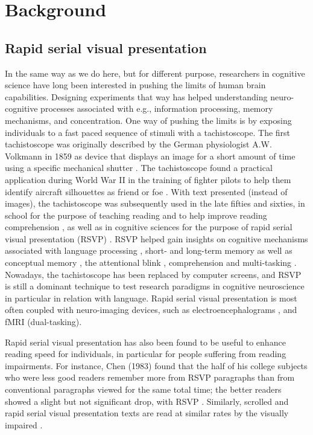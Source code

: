 \section{Background}
\label{background}

\subsection{Rapid serial visual presentation}
In the same way as we do here, but for different purpose, researchers in cognitive science have long been interested in pushing the limits of human brain capabilities. Designing experiments that way has helped understanding neuro-cognitive processes associated with e.g., information processing, memory mechanisms, and concentration. One way of pushing the limits is by exposing individuals to a fast paced sequence of stimuli with a tachistoscope. The first tachistoscope was originally described by the German physiologist A.W. Volkmann in 1859 as device that displays an image for a short amount of time using a specific mechanical shutter \cite{benschop1998tachistoscope}. The tachistoscope found a practical application  during World War II in the training of fighter pilots to help them identify aircraft silhouettes as friend or foe \cite{godnig2003tachistoscope}. With text presented (instead of images), the tachistoscope was subsequently used in the late fifties and sixties, in school for the purpose of teaching reading and to help improve reading comprehension \cite{brown1958teaching}, as well as in cognitive sciences for the purpose of rapid serial visual presentation (RSVP) \cite{potter1984rapid,potter1975time}. RSVP helped gain insights on cognitive mechanisms associated with language processing \cite{potter1984rapid}, short- and long-term memory as well as conceptual memory \cite{potter1993very}, the attentional blink \cite{shapiro1994attention}, comprehension \cite{weiss2005increased} and multi-tasking \cite{jolicoeur200013}. Nowadays, the tachistoscope has been replaced by computer screens, and RSVP is still a dominant technique to test research paradigms in cognitive neuroscience in particular in relation with language. Rapid serial visual presentation is most often coupled with neuro-imaging devices, such as electroencephalograms \cite{kranczioch2006eeg,mathan2008rapid}, and fMRI (dual-tasking)\cite{marcantoni2003neural}. 

Rapid serial visual presentation has also been found to be useful to enhance reading speed for individuals, in particular for people suffering from reading impairments. For instance, Chen (1983) found that the half of his college subjects who were less good readers remember more from RSVP paragraphs than from conventional paragraphs viewed for the same total time; the better readers showed a slight but not significant drop, with RSVP \cite{chen1986effects}. Similarly, scrolled and rapid serial visual presentation texts are read at similar rates by the visually impaired \cite{fine1995scrolled}.

